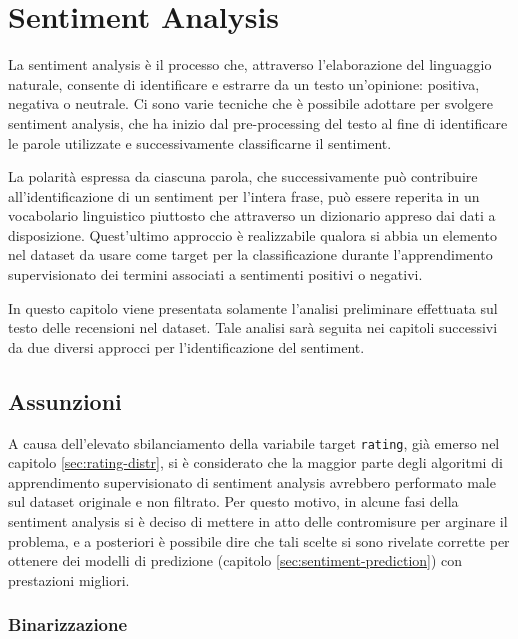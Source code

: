 \documentclass[hidelinks, 12pt]{article}
\begin{document}
\clearpage



\section{Sentiment Analysis}


La sentiment analysis è il processo che, attraverso l'elaborazione del linguaggio naturale, consente di identificare e estrarre da un testo un'opinione: positiva, negativa o neutrale. Ci sono varie tecniche che è possibile adottare per svolgere sentiment analysis, che ha inizio dal pre-processing del testo al fine di identificare le parole utilizzate e successivamente classificarne il sentiment.

La polarità espressa da ciascuna parola, che successivamente può contribuire all'identificazione di un sentiment per l'intera frase, può essere reperita in un vocabolario linguistico piuttosto che attraverso un dizionario appreso dai dati a disposizione. Quest'ultimo approccio è realizzabile qualora si abbia un elemento nel dataset da usare come target per la classificazione durante l'apprendimento supervisionato dei termini associati a sentimenti positivi o negativi.

In questo capitolo viene presentata solamente l'analisi preliminare effettuata sul testo delle recensioni nel dataset. Tale analisi sarà seguita nei capitoli successivi da due diversi approcci per l'identificazione del sentiment.



\subsection{Assunzioni}

A causa dell'elevato sbilanciamento della variabile target \texttt{rating}, già emerso nel capitolo \ref{sec:rating-distr}, si è considerato che la maggior parte degli algoritmi di apprendimento supervisionato di sentiment analysis avrebbero performato male sul dataset originale e non filtrato. Per questo motivo, in alcune fasi della sentiment analysis si è deciso di mettere in atto delle contromisure per arginare il problema, e a posteriori è possibile dire che tali scelte si sono rivelate corrette per ottenere dei modelli di predizione (capitolo \ref{sec:sentiment-prediction}) con prestazioni migliori.


\subsubsection{Binarizzazione}
\end{document}
